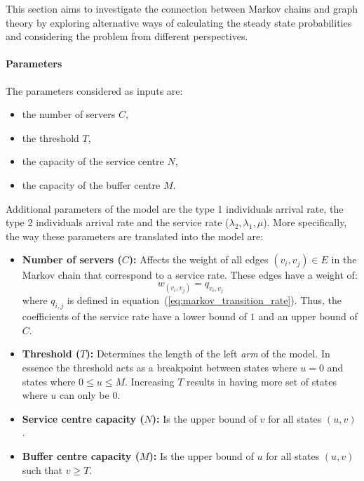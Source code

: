 This section aims to investigate the connection between Markov chains and graph 
theory by exploring alternative ways of calculating the steady state
probabilities and considering the problem from different perspectives.

\paragraph{Parameters}
The parameters considered as inputs are:
\begin{itemize}
    \item the number of servers \(C\),
    \item the threshold \(T\), 
    \item the capacity of the service centre \(N\),
    \item the capacity of the buffer centre \(M\). 
\end{itemize}

Additional parameters of the model are the type 1 individuals arrival rate, 
the type 2 individuals arrival rate and the service rate (\(\lambda_2, 
\lambda_1, \mu\)). 
More specifically, the way these parameters are translated into the model are:

\begin{itemize}
    \item \textbf{Number of servers (\(C\)):} Affects the weight of all edges 
    \((v_i, v_j) \in E\) in the Markov chain that correspond to a service rate. 
    These edges have a weight of: 
    \begin{equation*}
        w_{(v_i, v_j)} = q_{v_i, v_j}
    \end{equation*}
    where \(q_{i,j}\) is defined in equation~(\ref{eq:markov_transition_rate}).
    Thus, the coefficients of the service rate have a lower bound of \(1\) and 
    an upper bound of \(C\).
    \item \textbf{Threshold (\(T\)):} Determines the length of the left 
    \textit{arm} of the model. 
    In essence the threshold acts as a breakpoint between states where \(u=0\) 
    and states where \(0 \leq u \leq M\). 
    Increasing \(T\) results in having more set of states where \(u\) can only 
    be \(0\).
    \item \textbf{Service centre capacity (\(N\)):} Is the upper bound of \(v\)
    for all  states \((u,v)\).
    \item \textbf{Buffer centre capacity (\(M\)):} Is the upper bound of \(u\)
    for all states \((u,v)\) such that \(v \geq T\).
\end{itemize}


